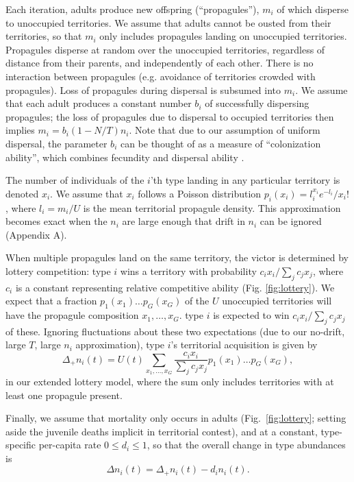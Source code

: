 \documentclass[11pt]{article}
\begin{document}
Each iteration, adults produce new offspring (``propagules''), $m_i$ of which disperse to unoccupied territories. We assume that adults cannot be ousted from their territories, so that $m_i$ only includes propagules landing on unoccupied territories. Propagules disperse at random over the unoccupied territories, regardless of distance from their parents, and independently of each other. There is no interaction between propagules (e.g. avoidance of territories crowded with propagules). Loss of propagules during dispersal is subsumed into $m_i$. We assume that each adult produces a constant number $b_i$ of successfully dispersing propagules; the loss of propagules due to dispersal to occupied territories then implies $m_i=b_i(1-N/T)n_i$. Note that due to our assumption of uniform dispersal, the parameter $b_i$ can be thought of as a measure of ``colonization ability'', which combines fecundity and dispersal ability \citep{levins_71,tilman_94,bolker_99}. 

The number of individuals of the $i$'th type landing in any particular territory is denoted $x_i$. We assume that $x_i$ follows a Poisson distribution $p_i(x_i)=l_i^{x_i} e^{-l_i}/x_i!$, where $l_i=m_i/U$ is the mean territorial propagule density. This approximation becomes exact when the $n_i$ are large enough that drift in $n_i$ can be ignored (Appendix A).

When multiple propagules land on the same territory, the victor is determined by lottery competition: type $i$ wins a territory with probability $c_i x_i/\sum_j c_j x_j$, where $c_i$ is a constant representing relative competitive ability (Fig. \ref{fig:lottery}). We expect that a fraction $p_1(x_1)\ldots p_G(x_G)$ of the $U$ unoccupied territories will have the propagule composition $x_1,\ldots,x_G$. type $i$ is expected to win $c_i x_i/\sum_j c_j x_j$ of these. Ignoring fluctuations about these two expectations (due to our no-drift, large $T$, large $n_i$ approximation), type $i$'s territorial acquisition is given by
\begin{equation}
\Delta_+ n_i(t)=U(t)\sum_{x_1,\ldots,x_G} \frac{c_i x_i}{\sum_j c_j x_j} p_1(x_1)\ldots p_G(x_G), \label{eq:growthsumuncoupled}
\end{equation}
in our extended lottery model, where the sum only includes territories with at least one propagule present.

Finally, we assume that mortality only occurs in adults (Fig.~\ref{fig:lottery}; setting aside the juvenile deaths implicit in territorial contest), and at a constant, type-specific per-capita rate $0\leq d_i\leq 1$, so that the overall change in type abundances is
\begin{equation}
\Delta n_i(t)=\Delta_+ n_i(t)-d_i n_i(t). \label{eq:delttot}
\end{equation}
\end{document}
